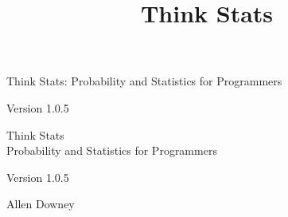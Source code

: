 \documentclass[12pt]{book}
\title{Think Stats}
\newcommand{\theversion}{1.0.5}
\begin{document}
\frontmatter




\newtheorem{ex}{Exercise}[chapter]

\begin{latexonly}

\renewcommand{\blankpage}{\thispagestyle{empty} \quad \newpage}



\thispagestyle{empty}

\begin{flushright}
\vspace*{2.0in}

\begin{spacing}{3}
{\huge Think Stats: Probability and Statistics for Programmers}\\
{\Large }
\end{spacing}

\vspace{0.25in}

Version \theversion

\vfill

\end{flushright}


\blankpage
\blankpage

\pagebreak
\thispagestyle{empty}

\begin{flushright}
\vspace*{2.0in}

\begin{spacing}{3}
{\huge Think Stats}\\
{\Large Probability and Statistics for Programmers}
\end{spacing}

\vspace{0.25in}

Version \theversion

\vspace{1in}


{\Large
Allen Downey\\
}



\end{flushright}
\end{latexonly}
\end{document}
